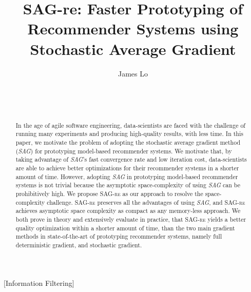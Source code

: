 \documentclass{sig-alternate}
\newcommand{\tool}{\textsc{SAG-re}\xspace}
\begin{document}


\title{{\ttlit SAG-re}: Faster Prototyping of Recommender Systems using Stochastic Average Gradient}
\author{
\alignauthor
James Lo\\	
       \\
       \\	   
       \\
}

\maketitle
\begin{abstract}
In the age of agile software engineering, data-scientists are faced with the challenge of running many experiments and producing high-quality results, with less time.
In this paper, we motivate the problem of adopting the stochastic average gradient method (\emph{SAG}) for prototyping model-based recommender systems.  
We motivate that, by taking advantage of \emph{SAG}'s fast convergence rate and low iteration cost, data-scientists are able to achieve better optimizations for their recommender systems in a shorter amount of time.
However, adopting \emph{SAG} in prototyping model-based recommender systems is not trivial because the asymptotic space-complexity of using \emph{SAG} can be prohibitively high.
We propose \tool as our approach to resolve the space-complexity challenge.
\tool preserves all the advantages of using \emph{SAG}, and \tool achieves asymptotic space complexity as compact as any memory-less approach.  
We both prove in theory and extensively evaluate in practice, that \tool yields a better quality optimization within a shorter amount of time, than the two main gradient methods in state-of-the-art of prototyping recommender systems, namely full deterministic gradient, and stochastic gradient.

\end{abstract}

[Information Filtering]
\end{document}

